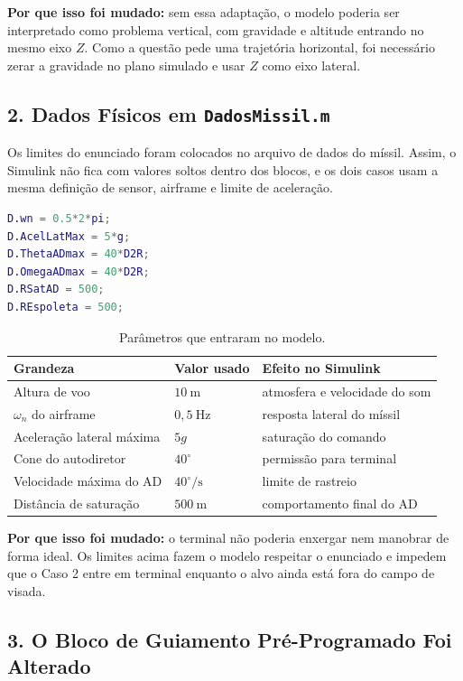 \textbf{Por que isso foi mudado:} sem essa adapta\c{c}\~ao, o modelo poderia ser interpretado como problema vertical, com gravidade e altitude entrando no mesmo eixo \(Z\). Como a quest\~ao pede uma trajet\'oria horizontal, foi necess\'ario zerar a gravidade no plano simulado e usar \(Z\) como eixo lateral.

\subsection{2. Dados F\'isicos em \texttt{DadosMissil.m}}

Os limites do enunciado foram colocados no arquivo de dados do m\'issil. Assim, o Simulink n\~ao fica com valores soltos dentro dos blocos, e os dois casos usam a mesma defini\c{c}\~ao de sensor, airframe e limite de acelera\c{c}\~ao.

\begin{lstlisting}[language=Matlab]
D.wn = 0.5*2*pi;
D.AcelLatMax = 5*g;
D.ThetaADmax = 40*D2R;
D.OmegaADmax = 40*D2R;
D.RSatAD = 500;
D.REspoleta = 500;
\end{lstlisting}

\begin{table}[H]
\centering
\caption{Par\^ametros que entraram no modelo.}
\begin{tabular}{lll}
\toprule
Grandeza & Valor usado & Efeito no Simulink \\
\midrule
Altura de voo & \(10~\text{m}\) & atmosfera e velocidade do som \\
\(\omega_n\) do airframe & \(0{,}5~\text{Hz}\) & resposta lateral do m\'issil \\
Acelera\c{c}\~ao lateral m\'axima & \(5g\) & satura\c{c}\~ao do comando \\
Cone do autodiretor & \(40^\circ\) & permiss\~ao para terminal \\
Velocidade m\'axima do AD & \(40^\circ/\text{s}\) & limite de rastreio \\
Dist\^ancia de satura\c{c}\~ao & \(500~\text{m}\) & comportamento final do AD \\
\bottomrule
\end{tabular}
\end{table}

\textbf{Por que isso foi mudado:} o terminal n\~ao poderia enxergar nem manobrar de forma ideal. Os limites acima fazem o modelo respeitar o enunciado e impedem que o Caso 2 entre em terminal enquanto o alvo ainda est\'a fora do campo de visada.

\subsection{3. O Bloco de Guiamento Pr\'e-Programado Foi Alterado}

